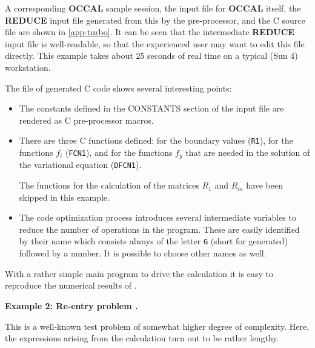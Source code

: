 \documentclass[12pt,a4paper]{article}
\newcommand{\OCCAL}{{\sf\bf OCCAL}}
\newcommand{\REDUCE}{{\sf\bf REDUCE}}
\newcommand{\C}{{\sf C}}
\begin{document}
A corresponding \OCCAL{} sample session, the input file for \OCCAL{}
itself, the \REDUCE{} input file generated from this by the
pre-processor, and the \C{} source file are shown in \ref{app-turbo}.
It can be seen that the intermediate \REDUCE{} input file is
well-readable, so that the experienced user may want to edit this file
directly. This example takes about $25$ seconds of real time on a
typical (Sun 4) workstation.

The file of generated \C{} code shows several interesting points:
\begin{itemize}
  \item The constants defined in the CONSTANTS section of the input
        file are rendered as \C{} pre-processor macros.

  \item There are three \C{} functions defined: for the boundary
        values (\verb|R1|), for the functions $f_{i}$ (\verb|FCN1|),
        and for the functions $f_{y}$ that are needed in the solution
        of the variational equation (\verb|DFCN1|).

        The functions for the calculation of the matrices $R_{1}$ and
        $R_{m}$ have been skipped in this example.
  \item The code optimization process introduces several intermediate
        variables to reduce the number of operations in the program.
        These are easily identified by their name which consists
        always of the letter \verb|G| (short for generated) followed
        by a number. It is possible to choose other names as well.
\end{itemize}

With a rather simple main program to drive the calculation it is easy
to reproduce the numerical results of \cite{Wulkow}.

\vspace*{3mm}

\noindent
{\bf Example 2: Re-entry problem \cite{SB}.}


This is a well-known test problem of somewhat higher degree of complexity.
Here, the expressions arising from the calculation turn out
to be rather lengthy.
\end{document}
